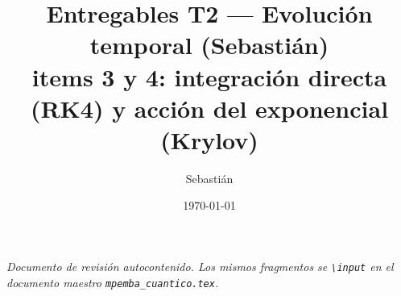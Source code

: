 \documentclass[11pt,a4paper]{article}
\title{\textbf{Entregables T2 --- Evolución temporal (Sebastián)}\\
\large items 3 y 4: integración directa (RK4) y acción del exponencial (Krylov)}
\author{Sebastián}
\date{\today}
\theoremstyle{definition}
\theoremstyle{plain}
\begin{document}
\maketitle
\begin{center}\itshape\small
Documento de revisión autocontenido. Los mismos fragmentos se
\texttt{\textbackslash input} en el documento maestro \texttt{mpemba\_cuantico.tex}.
\end{center}
\tableofcontents
\bigskip



\end{document}

